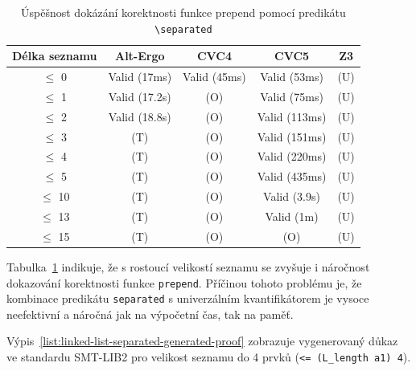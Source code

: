 
\begin{table}[H]
    \centering
    \begin{tabular}{|c|c|c|c|c|}
        \hline
        Délka seznamu & Alt-Ergo      & CVC4         & CVC5          & Z3  \\
        \hline
        $\leq$ 0      & Valid (17ms)  & Valid (45ms) & Valid (53ms)  & (U) \\
        $\leq$ 1      & Valid (17.2s) & (O)          & Valid (75ms)  & (U) \\
        $\leq$ 2      & Valid (18.8s) & (O)          & Valid (113ms) & (U) \\
        $\leq$ 3      & (T)           & (O)          & Valid (151ms) & (U) \\
        $\leq$ 4      & (T)           & (O)          & Valid (220ms) & (U) \\
        $\leq$ 5      & (T)           & (O)          & Valid (435ms) & (U) \\
        $\leq$ 10     & (T)           & (O)          & Valid (3.9s)  & (U) \\
        $\leq$ 13     & (T)           & (O)          & Valid (1m)    & (U) \\
        $\leq$ 15     & (T)           & (O)          & (O)           & (U) \\
        \hline
    \end{tabular}
    \caption{Úspěšnost dokázání korektnosti funkce prepend pomocí predikátu \texttt{\textbackslash separated}}
    \label{tab:prepend-smt-success}
\end{table}

Tabulka~\ref{tab:prepend-smt-success} indikuje,
že s rostoucí velikostí seznamu se zvyšuje i náročnost dokazování korektnosti funkce \texttt{prepend}.
Příčinou tohoto problému je, že kombinace predikátu \texttt{separated} s univerzálním kvantifikátorem
je vysoce neefektivní a náročná jak na výpočetní čas, tak na paměť.

Výpis~\ref{list:linked-list-separated-generated-proof}
zobrazuje vygenerovaný důkaz ve standardu SMT\mbox{-}LIB2
pro velikost seznamu do 4 prvků (\texttt{<= (L\_length a1) 4}).

